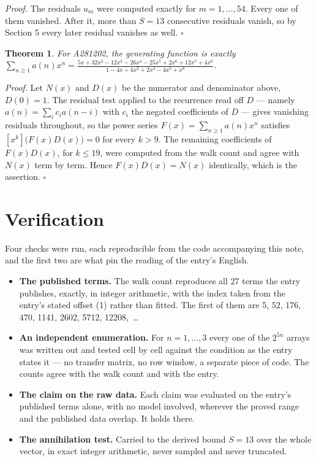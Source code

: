 \documentclass[11pt]{article}
\newtheorem{theorem}{Theorem}
\theoremstyle{definition}
\begin{document}
{\itshape Proof.} The residuals $u_m$ were computed exactly for $m = 1,\dots,54$. Every one of them vanished. After it, more than $S = 13$ consecutive residuals vanish, so by Section 5 every later residual vanishes as well. $\square$

\begin{theorem} For A281202, the generating function is exactly $\sum_{n\ge 1} a(n)x^n = \frac{5x + 32x^{2} - 12x^{3} - 26x^{4} - 25x^{5} + 2x^{6} + 12x^{7} + 4x^{8}}{1 - 4x + 4x^{2} + 2x^{4} - 4x^{5} + x^{8}}$.\end{theorem}

{\itshape Proof.} Let $N(x)$ and $D(x)$ be the numerator and denominator above, $D(0)=1$. The residual test applied to the recurrence read off $D$ --- namely $a(n) = \sum_i c_i a(n-i)$ with $c_i$ the negated coefficients of $D$ --- gives vanishing residuals throughout, so the power series $F(x)=\sum_{n\ge 1}a(n)x^n$ satisfies $[x^k]\bigl(F(x)D(x)\bigr) = 0$ for every $k > 9$. The remaining coefficients of $F(x)D(x)$, for $k \le 19$, were computed from the walk count and agree with $N(x)$ term by term. Hence $F(x)D(x) = N(x)$ identically, which is the assertion. $\square$

\section{Verification}

Four checks were run, each reproducible from the code accompanying this note, and the first two are what pin the reading of the entry's English.

\begin{itemize}

\item {\bfseries The published terms.} The walk count reproduces all 27 terms the entry publishes, exactly, in integer arithmetic, with the index taken from the entry's stated offset (1) rather than fitted. The first of them are 5, 52, 176, 470, 1141, 2602, 5712, 12208,~\dots

\item {\bfseries An independent enumeration.} For $n = 1,\dots,3$ every one of the $2^{5n}$ arrays was written out and tested cell by cell against the condition as the entry states it --- no transfer matrix, no row window, a separate piece of code. The counts agree with the walk count and with the entry.

\item {\bfseries The claim on the raw data.} Each claim was evaluated on the entry's published terms alone, with no model involved, wherever the proved range and the published data overlap. It holds there.

\item {\bfseries The annihilation test.} Carried to the derived bound $S = 13$ over the whole vector, in exact integer arithmetic, never sampled and never truncated.

\end{itemize}
\end{document}
